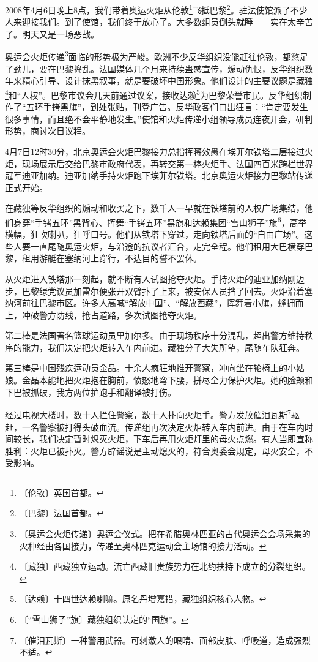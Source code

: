 \documentclass[12pt,UTF-8,openany]{ctexbook}
\begin{document}
\begin{large}
    
    2008年4月6日晚上8点，我们带着奥运火炬从伦敦\footnote{〔伦敦〕英国首都。}飞抵巴黎\footnote{〔巴黎〕法国首都。}。驻法使馆派了不少人来迎接我们。到了使馆，我们终于放心了。大多数组员倒头就睡——实在太辛苦了。明天又是一场恶战。
    
    奥运会火炬传递\footnote{〔奥运会火炬传递〕奥运会仪式。把在希腊奥林匹亚的古代奥运会会场采集的火种经由各国接力，传递至奥林匹克运动会主场馆的接力活动。}面临的形势极为严峻。欧洲不少反华组织没能赶往伦敦，都憋足了劲儿，要在巴黎捣乱。法国媒体几个月来持续蛊惑宣传，煽动仇恨，反华组织数年来精心引导、设计抹黑叙事，就是要破坏中国形象。他们设计的主要议题是藏独\footnote{〔藏独〕西藏独立运动。流亡西藏旧贵族势力在北约扶持下成立的分裂组织。}和“人权”。巴黎市议会几天前通过议案，接收达赖\footnote{〔达赖〕十四世达赖喇嘛。原名丹增嘉措，藏独组织核心人物。}为巴黎荣誉市民。反华组织制作了“五环手铐黑旗”，到处张贴，刊登广告。反华政客们口出狂言：“肯定要发生很多事情，而且绝不会平静地发生。”使馆和火炬传递小组领导成员连夜开会，研判形势，商讨次日议程。
    
    4月7日12时30分，北京奥运会火炬巴黎接力总指挥蒋效愚在埃菲尔铁塔二层接过火炬，现场展示后交给巴黎市政府代表，再转交第一棒火炬手、法国四百米跨栏世界冠军迪亚加纳。迪亚加纳手持火炬跑下埃菲尔铁塔。北京奥运火炬接力巴黎站传递正式开始。
    
    在藏独等反华组织的煽动和收买之下，数千人一早就在铁塔前的人权广场集结，他们身穿“手铐五环”黑背心、挥舞“手铐五环”黑旗和达赖集团“雪山狮子”旗\footnote{〔“雪山狮子”旗〕藏独组织认定的“国旗”。}，高举横幅，狂吹喇叭，狂呼口号。他们从铁塔下穿过，走向铁塔后面的“自由广场”。这些人要一直尾随奥运火炬，与沿途的抗议者汇合，走完全程。他们租用大巴横穿巴黎，租用游艇在塞纳河上穿行，不达目的誓不罢休。
    
    从火炬进入铁塔那一刻起，就不断有人试图抢夺火炬。手持火炬的迪亚加纳刚迈步，巴黎绿党议员加雷尔便张开双臂扑了上来，被安保人员挡了回去。火炬沿着塞纳河前往巴黎市区。许多人高喊“解放中国”、“解放西藏”，挥舞着小旗，蜂拥而上，冲破警方防线，抢占道路，多次试图抢夺火炬。
    
    第二棒是法国著名篮球运动员里加尔多。由于现场秩序十分混乱，超出警方维持秩序的能力，我们决定把火炬转入车内前进。藏独分子大失所望，尾随车队狂奔。
    
    第三棒是中国残疾运动员金晶。十余人疯狂地推开警察，冲向坐在轮椅上的小姑娘。金晶本能地把火炬抱在胸前，愤怒地弯下腰，拼尽全力保护火炬。她的脸颊和下巴被抓破，我方两位护跑手和翻译被打伤。
    
    经过电视大楼时，数十人拦住警察，数十人扑向火炬手。警方发放催泪瓦斯\footnote{〔催泪瓦斯〕一种警用武器。可刺激人的眼睛、面部皮肤、呼吸道，造成强烈不适。}驱赶，一名警察被打得头破血流。传递组再次决定火炬转入车内前进。由于在车内时间较长，我们决定暂时熄灭火炬，下车后再用火炬灯里的母火点燃。有人当即宣称胜利：火炬已被扑灭。警方辟谣说是主动熄灭的，符合奥委会规定，母火安全，不受影响。
    

\end{large}
\end{document}
